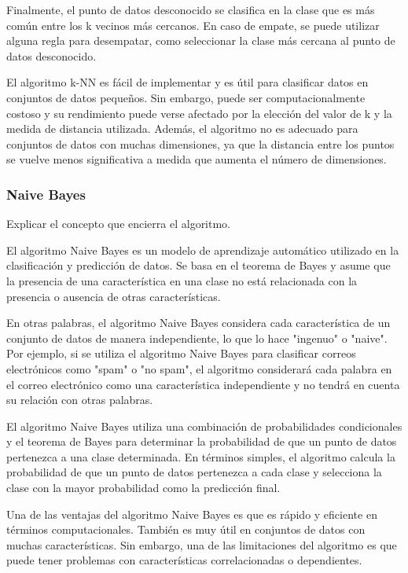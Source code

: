 \documentclass[12pt]{article}
\begin{document}
Finalmente, el punto de datos desconocido se clasifica en la clase que es más común entre los k vecinos más cercanos.
En caso de empate, se puede utilizar alguna regla para desempatar, como seleccionar la clase más cercana al punto
de datos desconocido.

El algoritmo k-NN es fácil de implementar y es útil para clasificar datos en conjuntos de datos pequeños.
Sin embargo, puede ser computacionalmente costoso y su rendimiento puede verse afectado por la elección del valor
de k y la medida de distancia utilizada. Además, el algoritmo no es adecuado para conjuntos de datos con muchas
dimensiones, ya que la distancia entre los puntos se vuelve menos significativa a medida que aumenta el número de
dimensiones.

\subsubsection*{Naive Bayes}

Explicar el concepto que encierra el algoritmo.

El algoritmo Naive Bayes es un modelo de aprendizaje automático utilizado en la clasificación y predicción de datos.
Se basa en el teorema de Bayes y asume que la presencia de una característica en una clase no está relacionada con
la presencia o ausencia de otras características.

En otras palabras, el algoritmo Naive Bayes considera cada característica de un conjunto de datos de manera
independiente, lo que lo hace "ingenuo" o "naive". Por ejemplo, si se utiliza el algoritmo Naive Bayes para clasificar
correos electrónicos como "spam" o "no spam", el algoritmo considerará cada palabra en el correo electrónico como
una característica independiente y no tendrá en cuenta su relación con otras palabras.

El algoritmo Naive Bayes utiliza una combinación de probabilidades condicionales y el teorema de Bayes para
determinar la probabilidad de que un punto de datos pertenezca a una clase determinada. En términos
simples, el algoritmo calcula la probabilidad de que un punto de datos pertenezca a cada clase y selecciona
la clase con la mayor probabilidad como la predicción final.

Una de las ventajas del algoritmo Naive Bayes es que es rápido y eficiente en términos computacionales.
También es muy útil en conjuntos de datos con muchas características. Sin embargo, una de las limitaciones
del algoritmo es que puede tener problemas con características correlacionadas o dependientes.
\end{document}
